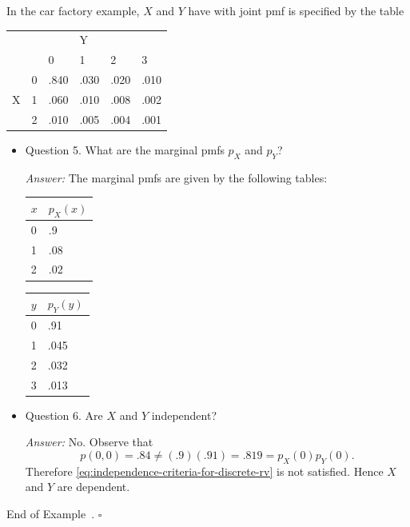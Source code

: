 \documentclass[10pt]{article}
\theoremstyle{definition}
\newtheorem{example}[theorem]{Example}
\renewenvironment{example}
{\begin{oldexample}}
  {\par\smallskip\hfill   End of Example~\theexample. $\square$    \par\end{oldexample}}
\newcommand{\1}[1]{\textbf{1}_{\left[#1\right]}} %
\begin{document}
\begin{example}
  In the car factory example, $X$ and $Y$ have with joint pmf is specified by
  the table
  \begin{center}
    \begin{tabular}{ll|llll}
      &   & & \quad Y    \\
      &   & 0   & 1    & 2    & 3    \\ \hline
      & 0 & .840 & .030  & .020  & .010  \\
      X& 1 & .060 & .010  & .008 & .002 \\
      & 2 & .010 & .005 & .004 & .001
    \end{tabular}
  \end{center}

  \begin{itemize}
    \item Question 5. What are the marginal pmfs $p_{X}$ and $p_{Y}$?

    \textit{Answer:} The marginal pmfs are given by the following tables:
    \begin{center}
      \begin{tabular}{l|l}
        $x$ & $p_X(x)$\\ \hline
        0& .9\\
        1& .08\\
        2& .02\\
      \end{tabular}
      \quad {} \quad
      \begin{tabular}{l|l}
        $y$ & $p_Y(y)$\\ \hline
        0& .91\\
        1& .045\\
        2& .032\\
        3& .013\\
      \end{tabular}
    \end{center}
    
    \item Question 6. Are $X$ and $Y$ independent?

    \textit{Answer:} No. Observe that
    \begin{equation*}
      p(0,0) = .84 \neq (.9)(.91) = .819 = p_{X}(0)p_{Y}(0).
    \end{equation*}
    Therefore \cref{eq:independence-criteria-for-discrete-rv} is not
    satisfied. Hence $X$ and $Y$ are dependent.
  \end{itemize}
   
\end{example}
\newpage
\end{document}
